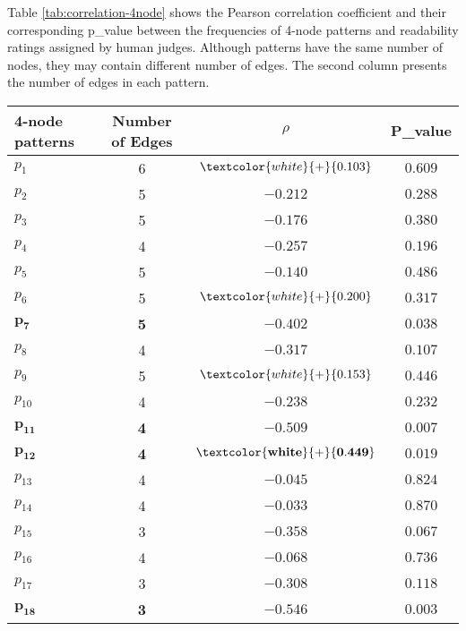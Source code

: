 Table \ref{tab:correlation-4node} shows the Pearson correlation coefficient and their corresponding p\_value between the frequencies of 4-node patterns and readability ratings assigned by human judges. 
Although patterns have the same number of nodes, they may contain different number of edges. 
The second column presents the number of edges in each pattern. 

\begin{table}[!ht]
	\begin{center}
		\begin{tabular}{lccc}
			\toprule
   			\textbf{4-node patterns}& \textbf{Number of Edges} & $\rho$ 		& \textbf{P\_value}				\\
   			\midrule
			$p_1$ 				& 6 			  & $\textcolor{white}{+}{0.103}$ 	& $0.609$					\\
			$p_2$ 				& 5 			  & $-0.212$ 					 	& $0.288$					\\
			$p_3$  				& 5				  & $-0.176$				     	& $0.380$					\\
			$p_4$  				& 4 			  & $-0.257$ 				     	& $0.196$					\\
			$p_5$ 				& 5 			  & $-0.140$ 					 	& $0.486$					\\
			$p_6$  				& 5 			  & $\textcolor{white}{+}{0.200}$  	& $0.317$					\\
			$\mathbf{p_7}$ 	& \textbf{5} 	  & $\mathbf{-0.402}$ 			 	& $\mathbf{0.038}$			\\
			$p_8$  				& 4 			  & $-0.317$ 					 	& $0.107$					\\
			$p_9$ 				& 5 			  & $\textcolor{white}{+}{0.153}$  	& $0.446$					\\
			$p_{10}$ 			& 4 			  & $-0.238$ 					 	& $0.232$					\\
			$\mathbf{p_{11}}$ 	& \textbf{4} 	  & $\mathbf{-0.509}$            	& $\mathbf{0.007}$			\\
			$\mathbf{p_{12}}$  	& \textbf{4} 	  & $\mathbf{\textcolor{white}{+}{0.449}}$ & $\mathbf{0.019}$	\\
			$p_{13}$			& 4 			  & $-0.045$ 						& $0.824$					\\
			$p_{14}$			& 4 			  & $-0.033$ 						& $0.870$					\\
			$p_{15}$			& 3				  & $-0.358$ 						& $0.067$					\\
			$p_{16}$ 			& 4 			  & $-0.068$ 						& $0.736$					\\
			$p_{17}$			& 3 			  & $-0.308$ 						& $0.118$					\\
			$\mathbf{p_{18}}$	& \textbf{3}	  & $\mathbf{-0.546}$				& $\mathbf{0.003}$			\\

\end{tabular}
\end{center}
\end{table}

